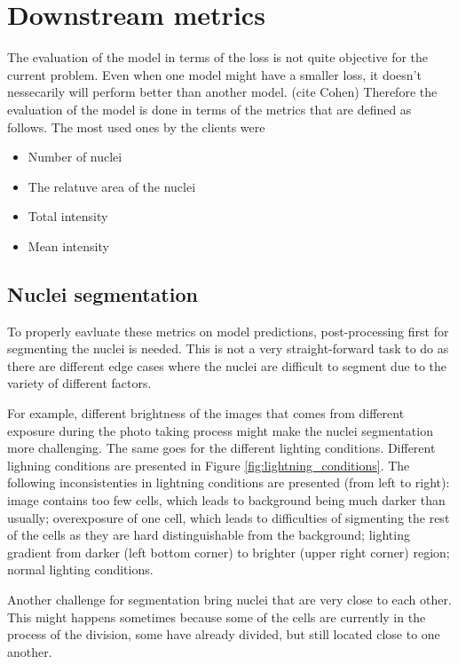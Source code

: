 \section{Downstream metrics}
The evaluation of the model in terms of the loss is not quite objective for the current problem. Even when one model might have a smaller loss, it doesn't nessecarily will perform better than another model. (cite Cohen) Therefore the evaluation of the model is done in terms of the metrics that are defined as follows. The most used ones by the clients were
\begin{itemize}
    \item Number of nuclei
    \item The relatuve area of the nuclei
    \item Total intensity
    \item Mean intensity
\end{itemize}

\subsection{Nuclei segmentation}
To properly eavluate these metrics on model predictions, post-processing first for segmenting the nuclei is needed. This is not a very straight-forward task to do as there are different edge cases where the nuclei are difficult to segment due to the variety of different factors. 

For example, different brightness of the images that comes from different exposure during the photo taking process might make the nuclei segmentation more challenging. The same goes for the different lighting conditions. Different lighning conditions are presented in Figure \ref{fig:lightning_conditions}. The following inconsistenties in lightning conditions are presented (from left to right): image contains too few cells, which leads to background being much darker than usually; overexposure of one cell, which leads to difficulties of sigmenting the rest of the cells as they are hard distinguishable from the background; lighting gradient from darker (left bottom corner) to brighter (upper right corner) region; normal lighting conditions.

Another challenge for segmentation bring nuclei that are very close to each other. This might happens sometimes because some of the cells are currently in the process of the division, some have already divided, but still located close to one another.

